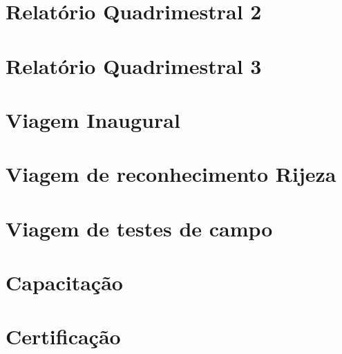\documentclass[a4paper,11pt,oneside,brazilian,
draft=false]{report}%
\begin{document}
\chapter{Relatório Quadrimestral 2}


\chapter{Relatório Quadrimestral 3}


\chapter{Viagem Inaugural}



\chapter{Viagem de reconhecimento Rijeza}



\chapter{Viagem de testes de campo}




\chapter{Capacitação}


\chapter{Certificação}







 
 
%
%
%
%
%
%
\end{document}

